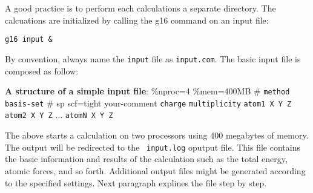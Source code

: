 	A good practice is to perform each calculations a separate directory. The calcuations are initialized by calling the g16 command on an input file:
	
	\texttt{g16 input \&}
	
	\noindent By convention, always name the \texttt{input} file as \texttt{input.com}. The basic input file is composed as follow:

	\begin{tip}
	\textbf{A structure of a simple input file}:
	\newline
	\%nproc=4 \newline
	\%mem=400MB \newline
	\# \texttt{method} \texttt{basis-set}  \newline
	\# sp scf=tight   \newline
	your-comment  \newline
	\texttt{charge} \texttt{multiplicity} \newline
	\texttt{atom1 X Y Z}  \newline
	\texttt{atom2 X Y Z}  \newline
	$\ldots$           \newline
	\texttt{atomN X Y Z}  
	\end{tip}
	\noindent{} The above starts a calculation on two processors using 400 megabytes of memory. The output will be redirected to the \texttt{ input.log} oputput file. This file contains the basic information and results of the calculation such as the total energy, atomic forces, and so forth. Additional output files might be generated according to the specified settings. Next paragraph explines the file step by step. 


